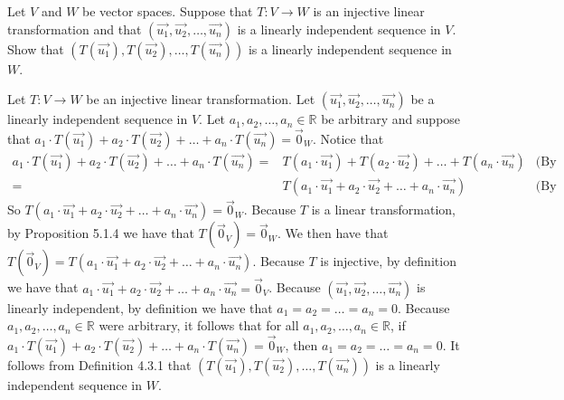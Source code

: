\documentclass[12pt]{article}
\newenvironment{problem}[2][Problem]
{
	\begin{trivlist} 
		\item[\hskip \labelsep {\bfseries #1 #2:}]
	}
{
	\end{trivlist}
	}
\newenvironment{solution}[1][Solution]
{
	\begin{trivlist} 
		\item[\hskip \labelsep {\itshape #1:}]
	}
	{
	\end{trivlist}
}
\begin{document}
\newpage
\begin{problem}{2}
Let $V$ and $W$ be vector spaces. Suppose that $T:V\to W$ is an injective linear transformation and that $(\vec{u_1},\vec{u_2},\dots,\vec{u_n})$ is a linearly independent sequence in $V$. Show that $(T(\vec{u_1}),T(\vec{u_2}), \dots, T(\vec{u_n}))$ is a linearly independent sequence in $W$.
\noindent
\newline
\newline
\begin{solution}
Let $T:V\to W$ be an injective linear transformation. Let $(\vec{u_1},\vec{u_2},\dots,\vec{u_n})$ be a linearly independent sequence in $V$. Let $a_1,a_2,\dots,a_n \in \mathbb{R}$ be arbitrary and suppose that $a_1\cdot T(\vec{u_1}) + a_2\cdot T(\vec{u_2}) + \dots + a_n\cdot T(\vec{u_n}) = \vec{0}_W$. Notice that
\begin{align*}
a_1\cdot T(\vec{u_1}) + a_2\cdot T(\vec{u_2}) + \dots + a_n\cdot T(\vec{u_n}) =& T(a_1\cdot \vec{u_1}) +T( a_2 \cdot \vec{u_2}) + \dots + T( a_n \cdot \vec{u_n}) & \text{(By Definition 5.1.1)}\\
=& T(a_1\cdot \vec{u_1} + a_2 \cdot \vec{u_2} + \dots + a_n \cdot \vec{u_n}) & \text{(By Defintion 5.1.1)}
\end{align*}
So $T(a_1\cdot \vec{u_1} + a_2 \cdot \vec{u_2} + \dots + a_n \cdot \vec{u_n}) = \vec{0}_W$. Because $T$ is a linear transformation, by Proposition 5.1.4 we have that $T(\vec{0}_V) = \vec{0}_W$. We then have that $T(\vec{0}_V) = T(a_1\cdot \vec{u_1} + a_2 \cdot \vec{u_2} + \dots + a_n \cdot \vec{u_n})$. Because $T$ is injective, by definition we have that $a_1\cdot \vec{u_1} + a_2 \cdot \vec{u_2} + \dots + a_n \cdot \vec{u_n} = \vec{0}_V$. Because $(\vec{u_1},\vec{u_2},\dots,\vec{u_n})$ is linearly independent, by definition we have that $a_1=a_2=\dots=a_n=0$. Because $a_1,a_2,\dots,a_n \in \mathbb{R}$ were arbitrary, it follows that for all $a_1,a_2,\dots,a_n \in \mathbb{R}$, if $a_1\cdot T(\vec{u_1}) + a_2\cdot T(\vec{u_2}) + \dots + a_n\cdot T(\vec{u_n}) = \vec{0}_W$, then $a_1=a_2=\dots=a_n=0$. It follows from Definition 4.3.1 that $(T(\vec{u_1}),T(\vec{u_2}), \dots, T(\vec{u_n}))$ is a linearly independent sequence in $W$.
\end{solution}
\end{problem}
\end{document}
